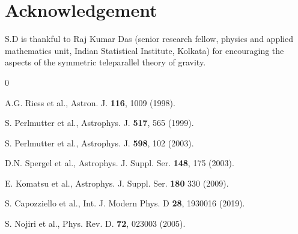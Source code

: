 \documentclass[showpacs,aps,amssymb,preprintnumbers,prd,amsmath,floatfix]{revtex4}
\begin{document}
\section{Acknowledgement}
S.D is thankful to Raj Kumar Das (senior research fellow, physics and applied mathematics unit, Indian Statistical Institute, Kolkata) for encouraging the aspects of the symmetric teleparallel theory of gravity.







\begin{thebibliography}{0}

A.G. Riess et al., Astron. J. \textbf{116}, 1009 (1998).

S. Perlmutter et al., Astrophys. J. \textbf{517}, 565 (1999).



S. Perlmutter et al., Astrophys. J. \textbf{598}, 102 (2003).

D.N. Spergel et al., Astrophys. J. Suppl. Ser. \textbf{148}, 175 (2003).









E. Komatsu et al., Astrophys. J. Suppl. Ser. \textbf{180} 330 (2009).

S. Capozziello et al., Int. J. Modern Phys. D \textbf{28}, 1930016 (2019). 

S. Nojiri et al., Phys. Rev. D. \textbf{72}, 023003 (2005).


\end{thebibliography}
\end{document}

